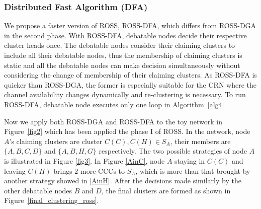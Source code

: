 \documentclass[10pt,journal,compsoc]{IEEEtran}
\theoremstyle{mytheoremstyle}
\theoremstyle{mytheoremstyle}
\theoremstyle{mytheoremstyle}
\begin{document}
\subsubsection{Distributed Fast Algorithm (DFA)}
We propose a faster version of ROSS, ROSS-DFA, which differs from ROSS-DGA in the second phase.
With ROSS-DFA, debatable nodes decide their respective cluster heads once.
The debatable nodes consider their claiming clusters to include all their debatable nodes, thus the membership of claiming clusters is static and all the debatable nodes can make decision simultaneously without considering the change of membership of their claiming clusters.
As ROSS-DFA is quicker than ROSS-DGA, the former is especially suitable for the CRN where the channel availability changes dynamically and re-clustering is necessary.
To run ROSS-DFA, debatable node executes only one loop in Algorithm~\ref{alg4}.

Now we apply both ROSS-DGA and ROSS-DFA to the toy network in Figure~\ref{fig2} which has been applied the phase I of ROSS.
In the network, node $A$'s claiming clusters are cluster $C(C), C(H)\in S_A$, their members are $\{A,B,C,D\}$ and $\{A,B,H,G\}$ respectively. 
The two possible strategies of node $A$ is illustrated in Figure \ref{fig3}.
In Figure \ref{AinC}, node $A$ staying in $C(C)$ and leaving $C(H)$ brings 2 more CCCs to $S_A$, which is more than that brought by another strategy showed in \ref{AinH}.
After the decisions made similarly by the other debatable nodes $B$ and $D$, the final clusters are formed as shown in Figure~\ref{final_clustering_ross}.

\end{document}
